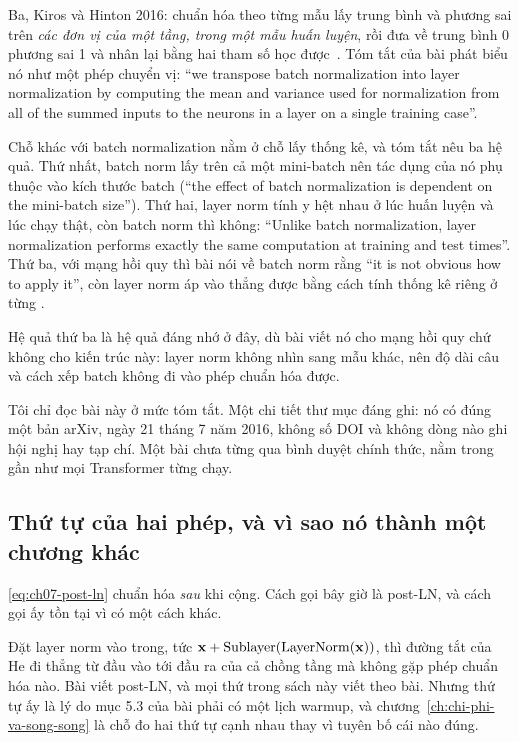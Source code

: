 \begin{bridge}{Ba, Kiros và Hinton 2016: chuẩn hóa theo từng mẫu}
%
 lấy trung bình và phương sai trên
\emph{các đơn vị của một tầng, trong một mẫu huấn luyện}, rồi đưa về trung bình
0 phương sai 1 và nhân lại bằng hai tham số học được~\autocite{ba2016layer}.
Tóm tắt của bài phát biểu nó như một phép chuyển vị:
\enquote{we transpose batch normalization into layer normalization by computing
the mean and variance used for normalization from all of the summed inputs to
the neurons in a layer on a single training case}.

Chỗ khác với batch normalization nằm ở chỗ lấy thống kê, và tóm tắt nêu ba hệ
quả. Thứ nhất, batch norm lấy trên cả một mini-batch nên tác dụng của nó phụ
thuộc vào kích thước batch (\enquote{the effect of batch normalization is
dependent on the mini-batch size}). Thứ hai, layer norm tính y hệt nhau ở lúc
huấn luyện và lúc chạy thật, còn batch norm thì không:
\enquote{Unlike batch normalization, layer normalization performs exactly the
same computation at training and test times}. Thứ ba, với mạng hồi quy thì bài
nói về batch norm rằng \enquote{it is not obvious how to apply it}, còn layer
norm áp vào thẳng được bằng cách tính thống kê riêng ở từng
.

Hệ quả thứ ba là hệ quả đáng nhớ ở đây, dù bài viết nó cho mạng hồi quy chứ
không cho kiến trúc này: layer norm không nhìn sang mẫu khác, nên độ dài câu và
cách xếp batch không đi vào phép chuẩn hóa được.

Tôi chỉ đọc bài này ở mức tóm tắt. Một chi tiết thư mục đáng ghi: nó có đúng
một bản arXiv, ngày 21 tháng 7 năm 2016, không số DOI và không dòng nào ghi hội
nghị hay tạp chí. Một bài chưa từng qua bình duyệt chính thức, nằm trong gần
như mọi Transformer từng chạy.
\end{bridge}

\subsection*{Thứ tự của hai phép, và vì sao nó thành một chương khác}

%
\eqref{eq:ch07-post-ln} chuẩn hóa \emph{sau} khi cộng. Cách gọi bây giờ là
post-LN, và cách gọi ấy tồn tại vì có một cách khác.

Đặt layer norm vào trong, tức \(\mathbf{x} + \mathrm{Sublayer}(\operatorname{LayerNorm}(\mathbf{x}))\),
thì đường tắt của He đi thẳng từ đầu vào tới đầu ra của cả chồng tầng mà không
gặp phép chuẩn hóa nào. Bài viết post-LN, và mọi thứ trong sách này viết theo
bài. Nhưng thứ tự ấy là lý do mục 5.3 của bài phải có một lịch warmup, và
chương~\ref{ch:chi-phi-va-song-song} là chỗ đo hai thứ tự cạnh nhau thay vì
tuyên bố cái nào đúng.

